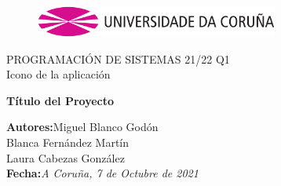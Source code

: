 \documentclass[a4paper,openright,12pt]{article}
\begin{document}
\begin{titlepage}

\begin{center}
\vspace*{-1in}
\begin{figure}[htb]
\begin{center}
\includegraphics[width=8cm]{udc.eps}
\end{center}
\end{figure}

\vspace*{1in}
PROGRAMACIÓN DE SISTEMAS 21/22 Q1\\
Icono de la aplicación\\
\vspace*{1in}
\begin{Large}
\textbf{Título del Proyecto} \\
\end{Large}

\vspace*{3in}

\begin{large}
\raggedleft
\textbf{Autores:}Miguel Blanco Godón \\
Blanca Fernández Martín\\
Laura Cabezas González\\
\textbf{Fecha:}\textit{A Coruña, 7 de Octubre de 2021}\\
\end{large}

\end{center}
\end{titlepage} 

\newpage



\tableofcontents

\vspace{5cm}
\end{document}
